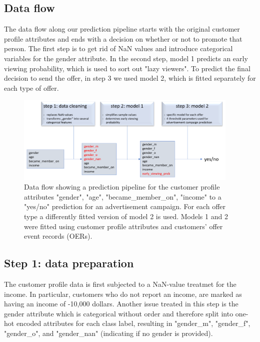 \documentclass[11pt]{article} %
\begin{document}
\subsection{Data flow}
The data flow along our prediction pipeline starts with the original customer profile attributes and ends with a decision on whether or not to promote that person. The first step is to get rid of NaN values and introduce categorical variables for the gender attribute. In the second step, model 1 predicts an early viewing probability, which is used to sort out "lazy viewers".  To predict the final decision to send the offer, in step 3 we used model 2, which is fitted separately for each type of offer.
\begin{figure}[H]
\includegraphics[width=0.95\textwidth]{dataflow.png}
\caption{Data flow showing a prediction  pipeline for the customer profile attributes  "gender", "age", "became\_member\_on", "income" to a "yes/no" prediction for an advertisement campaign. For each offer type a differently fitted version of model 2 is used. Models 1 and 2 were fitted using customer profile attributes and customers' offer event records (OERs).}
\end{figure}

\subsection{Step 1: data preparation}
The customer profile data is first subjected to a NaN-value treatmet for the income.
In particular, customers who do not report an income, are marked as having an income of -10,000 dollars.
Another issue treated in this step is the gender attribute which is categorical without order and therefore split into one-hot encoded attributes for each class label, resulting in "gender\_m", "gender\_f", "gender\_o",  and "gender\_nan" (indicating if no gender is provided).
\end{document}
